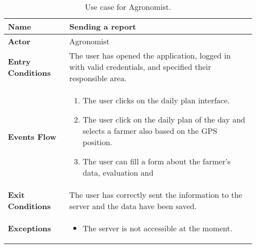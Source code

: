 \begin{table}[hbt!]
\centering
\caption{\label{tab:addOne{figure_counter}}Use case for Agronomist.}

\renewcommand{\arraystretch}{1.25}
\begin{tabular}{|l|>{\raggedright\arraybackslash}m{12cm}|}
    \hline
    \textbf{Name} & Sending a report\\
    \hline
   	\textbf{Actor} & Agronomist\\
    \hline
    \textbf{Entry Conditions} & The user has opened the application, logged in with valid credentials, and specified their responsible area.\\    
    \hline
    \textbf{Events Flow} & 
    	\begin{enumerate}
            \item The user clicks on the daily plan interface.
            \item The user click on the daily plan of the day and selects a farmer also based on the GPS position.
            \item The user can fill a form about the farmer's data, evaluation and 
       \end{enumerate}\\
    \hline
    \textbf{Exit Conditions} & The user has correctly sent the information to the server and the data have been saved.\\
    \hline
    \textbf{Exceptions} & 
    	\begin{itemize}
	    	\item The server is not accessible at the moment.
    	\end{itemize}\\
    \hline 
\end{tabular}
\end{table}

